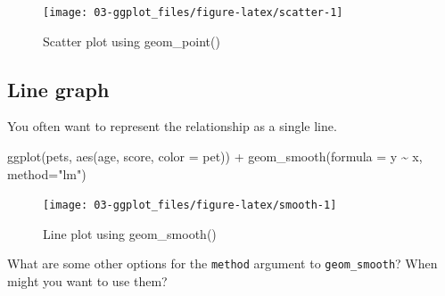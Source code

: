 \documentclass[
  oneside]{book}
\newenvironment{Shaded}{\begin{snugshade}}{\end{snugshade}}
\newcommand{\AttributeTok}[1]{\textcolor[rgb]{0.77,0.63,0.00}{#1}}
\newcommand{\FunctionTok}[1]{\textcolor[rgb]{0.00,0.00,0.00}{#1}}
\newcommand{\NormalTok}[1]{#1}
\newcommand{\SpecialCharTok}[1]{\textcolor[rgb]{0.00,0.00,0.00}{#1}}
\newcommand{\StringTok}[1]{\textcolor[rgb]{0.31,0.60,0.02}{#1}}
\begin{document}
\begin{figure}

{\centering \texttt{[image: 03-ggplot\_files/figure-latex/scatter-1]} 

}

\caption{Scatter plot using geom_point()}\label{fig:scatter}
\end{figure}

\hypertarget{geom_smooth}{%
\subsection{Line graph}\label{geom_smooth}}

You often want to represent the relationship as a single line.

\begin{Shaded}
\begin{Highlighting}[]
\FunctionTok{ggplot}\NormalTok{(pets, }\FunctionTok{aes}\NormalTok{(age, score, }\AttributeTok{color =}\NormalTok{ pet)) }\SpecialCharTok{+}
  \FunctionTok{geom\_smooth}\NormalTok{(}\AttributeTok{formula =}\NormalTok{ y }\SpecialCharTok{\textasciitilde{}}\NormalTok{ x, }\AttributeTok{method=}\StringTok{"lm"}\NormalTok{)}
\end{Highlighting}
\end{Shaded}

\begin{figure}

{\centering \texttt{[image: 03-ggplot\_files/figure-latex/smooth-1]} 

}

\caption{Line plot using geom_smooth()}\label{fig:smooth}
\end{figure}

\begin{try}
What are some other options for the \texttt{method} argument to \texttt{geom\_smooth}? When might you want to use them?

\end{try}
\end{document}
